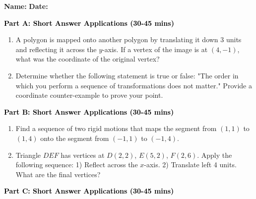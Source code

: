 \documentclass[12pt, letterpaper, fleqn]{article}
\begin{document}
\textbf{Name:} \underline{\hspace{5cm}}
\hfill
\textbf{Date:} \underline{\hspace{3cm}}\\


\begin{tcolorbox}[colback=customteal!20]
\large\textcolor{black}{\textbf{Part A: Short Answer Applications (30-45 mins)}}
\end{tcolorbox}

\vspace{3mm}

\begin{enumerate}[itemsep=4.2cm, leftmargin=0.6cm]
\item A polygon is mapped onto another polygon by translating it down 3 units and reflecting it across the $y$-axis. If a vertex of the image is at $(4, -1)$, what was the coordinate of the original vertex?
\item Determine whether the following statement is true or false: "The order in which you perform a sequence of transformations does not matter." Provide a coordinate counter-example to prove your point.
\end{enumerate}

\newpage

\begin{tcolorbox}[colback=customteal!20]
\large\textcolor{black}{\textbf{Part B: Short Answer Applications (30-45 mins)}}
\end{tcolorbox}

\vspace{3mm}

\begin{enumerate}[itemsep=4.2cm, leftmargin=0.6cm, resume]
\item Find a sequence of two rigid motions that maps the segment from $(1, 1)$ to $(1, 4)$ onto the segment from $(-1, 1)$ to $(-1, 4)$.
\item Triangle $DEF$ has vertices at $D(2, 2)$, $E(5, 2)$, $F(2, 6)$. Apply the following sequence: 1) Reflect across the $x$-axis. 2) Translate left 4 units. What are the final vertices?
\end{enumerate}

\newpage

\begin{tcolorbox}[colback=customteal!20]
\large\textcolor{black}{\textbf{Part C: Short Answer Applications (30-45 mins)}}
\end{tcolorbox}
\end{document}
